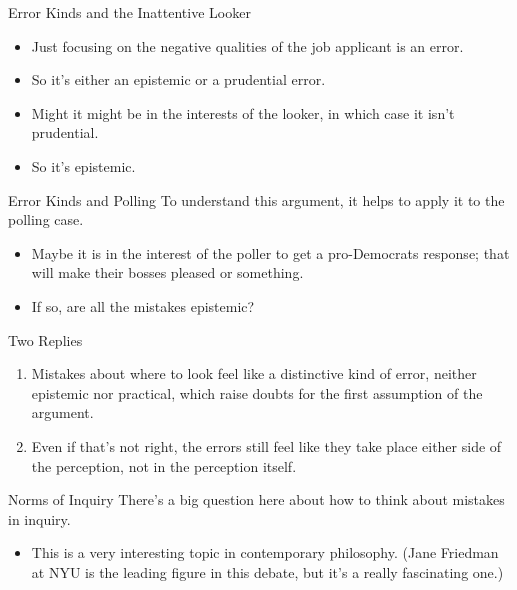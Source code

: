 \documentclass[
  17pt,
  letterpaper,
  ignorenonframetext,
  aspectratio=169,
  xcolor={dvipsnames}]{beamer}
\providecommand{\tightlist}{%
  \setlength{\itemsep}{0pt}\setlength{\parskip}{0pt}}\usepackage{longtable,booktabs,array}
\begin{document}
\begin{frame}{Error Kinds and the Inattentive Looker}
\protect\hypertarget{error-kinds-and-the-inattentive-looker}{}
\begin{itemize}[<+->]
\tightlist
\item
  Just focusing on the negative qualities of the job applicant is an
  error.
\item
  So it's either an epistemic or a prudential error.
\item
  Might it might be in the interests of the looker, in which case it
  isn't prudential.
\item
  So it's epistemic.
\end{itemize}
\end{frame}

\begin{frame}{Error Kinds and Polling}
\protect\hypertarget{error-kinds-and-polling}{}
To understand this argument, it helps to apply it to the polling case.

\begin{itemize}[<+->]
\tightlist
\item
  Maybe it is in the interest of the poller to get a pro-Democrats
  response; that will make their bosses pleased or something.
\item
  If so, are all the mistakes epistemic?
\end{itemize}
\end{frame}

\begin{frame}{Two Replies}
\protect\hypertarget{two-replies}{}
\begin{enumerate}[<+->]
\tightlist
\item
  Mistakes about where to look feel like a distinctive kind of error,
  neither epistemic nor practical, which raise doubts for the first
  assumption of the argument.
\item
  Even if that's not right, the errors still feel like they take place
  either side of the perception, not in the perception itself.
\end{enumerate}
\end{frame}

\begin{frame}{Norms of Inquiry}
\protect\hypertarget{norms-of-inquiry}{}
There's a big question here about how to think about mistakes in
inquiry.

\begin{itemize}[<+->]
\tightlist
\item
  This is a very interesting topic in contemporary philosophy. (Jane
  Friedman at NYU is the leading figure in this debate, but it's a
  really fascinating one.)
\end{itemize}
\end{frame}
\end{document}
